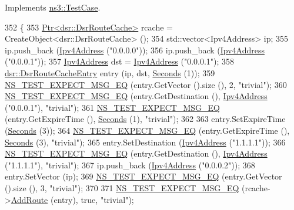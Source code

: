Implements \hyperlink{classns3_1_1TestCase_a8ff74680cf017ed42011e4be51917a24}{ns3\+::\+Test\+Case}.


\begin{DoxyCode}
352 \{
353   \hyperlink{classns3_1_1Ptr}{Ptr<dsr::DsrRouteCache>} rcache = CreateObject<dsr::DsrRouteCache> ();
354   std::vector<Ipv4Address> ip;
355   ip.push\_back (\hyperlink{classns3_1_1Ipv4Address}{Ipv4Address} (\textcolor{stringliteral}{"0.0.0.0"}));
356   ip.push\_back (\hyperlink{classns3_1_1Ipv4Address}{Ipv4Address} (\textcolor{stringliteral}{"0.0.0.1"}));
357   \hyperlink{classns3_1_1Ipv4Address}{Ipv4Address} dst = \hyperlink{classns3_1_1Ipv4Address}{Ipv4Address} (\textcolor{stringliteral}{"0.0.0.1"});
358   \hyperlink{classns3_1_1dsr_1_1DsrRouteCacheEntry}{dsr::DsrRouteCacheEntry} entry (ip, dst, \hyperlink{group__timecivil_ga33c34b816f8ff6628e33d5c8e9713b9e}{Seconds} (1));
359   \hyperlink{group__testing_ga7304ba46a28d8cf08dfdfd6499cf7068}{NS\_TEST\_EXPECT\_MSG\_EQ} (entry.GetVector ().size (), 2, \textcolor{stringliteral}{"trivial"});
360   \hyperlink{group__testing_ga7304ba46a28d8cf08dfdfd6499cf7068}{NS\_TEST\_EXPECT\_MSG\_EQ} (entry.GetDestination (), 
      \hyperlink{classns3_1_1Ipv4Address}{Ipv4Address} (\textcolor{stringliteral}{"0.0.0.1"}), \textcolor{stringliteral}{"trivial"});
361   \hyperlink{group__testing_ga7304ba46a28d8cf08dfdfd6499cf7068}{NS\_TEST\_EXPECT\_MSG\_EQ} (entry.GetExpireTime (), \hyperlink{group__timecivil_ga33c34b816f8ff6628e33d5c8e9713b9e}{Seconds} (1), \textcolor{stringliteral}{"trivial"});
362 
363   entry.SetExpireTime (\hyperlink{group__timecivil_ga33c34b816f8ff6628e33d5c8e9713b9e}{Seconds} (3));
364   \hyperlink{group__testing_ga7304ba46a28d8cf08dfdfd6499cf7068}{NS\_TEST\_EXPECT\_MSG\_EQ} (entry.GetExpireTime (), \hyperlink{group__timecivil_ga33c34b816f8ff6628e33d5c8e9713b9e}{Seconds} (3), \textcolor{stringliteral}{"trivial"});
365   entry.SetDestination (\hyperlink{classns3_1_1Ipv4Address}{Ipv4Address} (\textcolor{stringliteral}{"1.1.1.1"}));
366   \hyperlink{group__testing_ga7304ba46a28d8cf08dfdfd6499cf7068}{NS\_TEST\_EXPECT\_MSG\_EQ} (entry.GetDestination (), 
      \hyperlink{classns3_1_1Ipv4Address}{Ipv4Address} (\textcolor{stringliteral}{"1.1.1.1"}), \textcolor{stringliteral}{"trivial"});
367   ip.push\_back (\hyperlink{classns3_1_1Ipv4Address}{Ipv4Address} (\textcolor{stringliteral}{"0.0.0.2"}));
368   entry.SetVector (ip);
369   \hyperlink{group__testing_ga7304ba46a28d8cf08dfdfd6499cf7068}{NS\_TEST\_EXPECT\_MSG\_EQ} (entry.GetVector ().size (), 3, \textcolor{stringliteral}{"trivial"});
370 
371   \hyperlink{group__testing_ga7304ba46a28d8cf08dfdfd6499cf7068}{NS\_TEST\_EXPECT\_MSG\_EQ} (rcache->\hyperlink{classns3_1_1dsr_1_1DsrRouteCache_aff3dfb9a3d25a73e79363e8d6d977003}{AddRoute} (entry), \textcolor{keyword}{true}, \textcolor{stringliteral}{"trivial"});

\end{DoxyCode}
